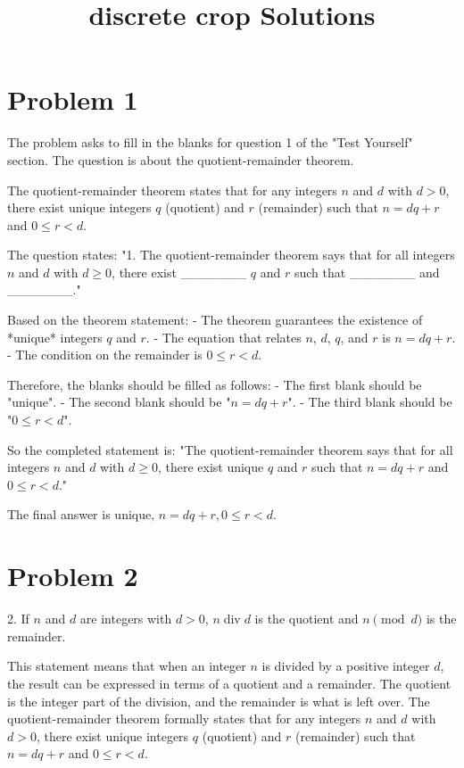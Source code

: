 \documentclass{article}
\begin{document}
\title{discrete crop Solutions}
\maketitle
\section*{Problem 1}
The problem asks to fill in the blanks for question 1 of the "Test Yourself" section. The question is about the quotient-remainder theorem.

The quotient-remainder theorem states that for any integers $n$ and $d$ with $d > 0$, there exist unique integers $q$ (quotient) and $r$ (remainder) such that $n = dq + r$ and $0 \le r < d$.

The question states: "1. The quotient-remainder theorem says that for all integers $n$ and $d$ with $d \ge 0$, there exist \_\_\_\_\_\_\_ $q$ and $r$ such that \_\_\_\_\_\_\_ and \_\_\_\_\_\_\_."

Based on the theorem statement:
- The theorem guarantees the existence of *unique* integers $q$ and $r$.
- The equation that relates $n$, $d$, $q$, and $r$ is $n = dq + r$.
- The condition on the remainder is $0 \le r < d$.

Therefore, the blanks should be filled as follows:
- The first blank should be "unique".
- The second blank should be "$n = dq + r$".
- The third blank should be "$0 \le r < d$".

So the completed statement is: "The quotient-remainder theorem says that for all integers $n$ and $d$ with $d \ge 0$, there exist unique $q$ and $r$ such that $n = dq + r$ and $0 \le r < d$."

The final answer is $\boxed{\text{unique, } n = dq + r, 0 \le r < d}$.

\newpage

\section*{Problem 2}
2. If $n$ and $d$ are integers with $d > 0$, $n \operatorname{div} d$ is the quotient and $n \pmod{d}$ is the remainder.

This statement means that when an integer $n$ is divided by a positive integer $d$, the result can be expressed in terms of a quotient and a remainder. The quotient is the integer part of the division, and the remainder is what is left over. The quotient-remainder theorem formally states that for any integers $n$ and $d$ with $d > 0$, there exist unique integers $q$ (quotient) and $r$ (remainder) such that $n = dq + r$ and $0 \le r < d$.
\end{document}
